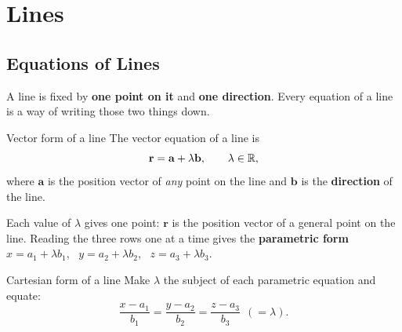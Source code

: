 \clearpage
\section{Lines}
\subsection{Equations of Lines}
A line is fixed by \textbf{one point on it} and \textbf{one direction}. Every equation of a line is a way of writing those two things down.

\begin{definition}{Vector form of a line}
The vector equation of a line is
\[
\mathbf{r} = \mathbf{a} + \lambda\mathbf{b}, \qquad \lambda\in\mathbb{R},
\]
where $\mathbf{a}$ is the position vector of \emph{any} point on the line and $\mathbf{b}$ is the \textbf{direction} of the line.
\end{definition}
Each value of $\lambda$ gives one point: $\mathbf{r}$ is the position vector of a general point on the line. Reading the three rows one at a time gives the \textbf{parametric form} $x = a_1 + \lambda b_1$, \ $y = a_2 + \lambda b_2$, \ $z = a_3 + \lambda b_3$.

\begin{definition}{Cartesian form of a line}
Make $\lambda$ the subject of each parametric equation and equate:
\[
\dfrac{x-a_1}{b_1} = \dfrac{y-a_2}{b_2} = \dfrac{z-a_3}{b_3}\ \ (=\lambda).
\]
\end{definition}

\begin{center}
\end{center}

